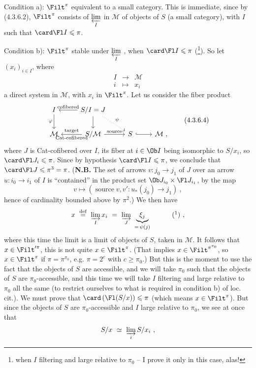 
\noindent{}Condition a): $\Filt^\pi$ equivalent to a small category. This is immediate, since by (4.3.6.2), $\Filt^\pi$ consists of $\varprojlim\limits_I$ in $\mathcal M$ of objects of $S$ (a small category), with $I$ such that $\card\Fl I\leqslant\pi$.

\noindent Condition b): $\Filt^\pi$ stable under $\varprojlim\limits_I$ , when $\card\Fl I\leqslant\pi$ (\footnote{when $I$ filtering and large relative to $\pi_0$ -- I prove it only in this case, alas!}). So let $(x_i)_{i\in I}$, where
\[
\begin{array}{ccc}
I & \longrightarrow & \mathcal M\\[1ex]
i & \longmapsto & x_i
\end{array}
\]
a direct system in $\mathcal M$, with $x_i$ in $\Filt^\pi$. Let us consider the fiber product
\[
\begin{tikzcd}
I \arrow[d, "\varphi"'] & S/I = J \arrow[l, "\text{cofibered}"'] \arrow[d] \arrow[dr, dotted, "\psi"] & & \\
\mathcal M & S/\mathcal M \arrow[l, "\text{target}"', "\text{Cat-cofibered}"] \arrow[r, "\text{source}"] & S \arrow[r, hook] & \mathcal M\ ,
\end{tikzcd}
\tag*{(4.3.6.4)}
\]
where $J$ is Cat-cofibered over $I$, its fiber at $i\in\Ob I$ being isomorphic to $S/x_i$, so $\card\Fl J_i\leqslant\pi$. Since by hypothesis $\card\Fl I\leqslant\pi$, we conclude that $\card\Fl J\leqslant\pi^3=\pi$. (\textbf{N.B.} The set of arrows $v:j_0\longrightarrow j_1$ of $J$ over an arrow $u:i_0\longrightarrow i_1$ of $I$ is ``contained'' in the product set $\Ob J_{i_0}\times\Fl J_{i_1}$, by the map
\[
v\longmapsto(\operatorname{source}v,v':u_*(j_0)\longrightarrow j_1)\ ,
\]
hence of cardinality bounded above by $\pi^2$.) We then have
\[
x\ \overset{\text{def}}{=}\ \varinjlim_I x_i\ =\ \varinjlim_J\ \underbrace{\xi_j}_{=\,\psi(j)}\qquad\quad\mbox{(\footnotemark)}\ ,
\]
%
where this time the limit is a limit of objects of $S$, taken in $\mathcal M$. It follows that $x\in\Filt'^{\pi}$, this is not quite $x\in\Filt^\pi$. (That implies $x\in\Filt^{\pi^{\pi_0}}$, so $x\in\Filt^\pi$ if $\pi=\pi^{\pi_0}$, e.g. $\pi=2^c$ with $c\geqslant\pi_0$.) But this is the moment to use the fact that the objects of $S$ are accessible, and we will take $\pi_0$ such that the objects of $S$ are $\pi_0$-accessible, and this time we will take $I$ filtering and large relative to $\pi_0$ all the same (to restrict ourselves to what is required in condition b) of loc. cit.). We must prove that $\card\,(\Fl(S/x))\leqslant\pi$ (which means $x\in\Filt^\pi$). But since the objects of $S$ are $\pi_0$-accessible and $I$ large relative to $\pi_0$, we see at once that
\[
S/x\ \simeq\ \varinjlim_i S/x_i\ ,
\]
